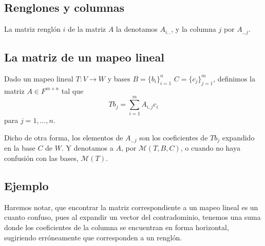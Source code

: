 \documentclass{article}
\begin{document}
\subsection{Renglones y columnas}
La matriz renglón $i$ de la matriz $A$ la denotamos
$A_{i,.}$, y la columna $j$ por $A_{.,j}$.

\subsection{La matriz de un mapeo lineal}
Dado un mapeo lineal $T: V\rightarrow W$ y bases $B=\{b_i\}^n_{i=1}$
$C=\{c_j\}^m_{j=1}$, definimos la matriz $A\in F^{m\times n}$ tal que
$$Tb_j = \sum^m_{i=1} A_{i,j} c_i$$
para $j=1,\ldots,n$.

Dicho de otra forma, los elementos de $A_{.,j}$ son los coeficientes
de $Tb_j$ expandido en la base $C$ de $W$. Y denotamos a $A$, por
$\mathcal{M}(T,B,C)$, o cuando no haya confusión con las bases,
$\mathcal{M}(T)$.

\subsection{Ejemplo}
Haremos notar, que encontrar la matriz correspondiente a un mapeo lineal
es un cuanto confuso, pues al expandir un vector del contradominio,
tenemos una suma donde los coeficientes de la columna se encuentran
en forma horizontal, sugiriendo erróneamente que corresponden a un
renglón.
\end{document}
